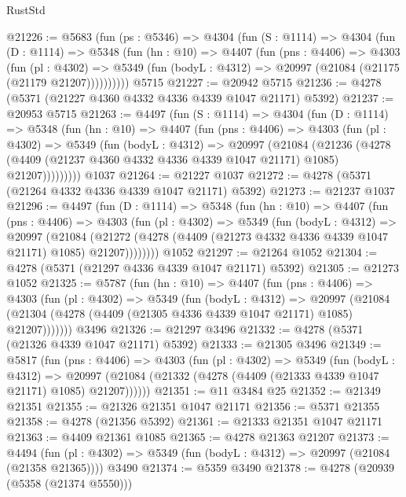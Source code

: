 \begin{lexlean}{RustStd}
\begin{coremodule}
{\begin{coremodule}
{{{{{{{{{{{{{{{{{{{{{{{{{{{{{{{{{{{@21226 := @5683
    (fun (ps : @5346) =>
    @4304
      (fun (S : @1114) =>
      @4304
        (fun (D : @1114) =>
        @5348
          (fun (hn : @10) =>
          @4407
            (fun (pns : @4406) =>
            @4303
              (fun (pl : @4302) =>
              @5349 (fun (bodyL : @4312) => @20997 (@21084 (@21175 (@21179 @21207))))))))))
    @5715
@21227 := @20942 @5715
@21236 := @4278 (@5371 (@21227 @4360 @4332 @4336 @4339 @1047 @21171) @5392)
@21237 := @20953 @5715
@21263 := @4497
    (fun (S : @1114) =>
    @4304
      (fun (D : @1114) =>
      @5348
        (fun (hn : @10) =>
        @4407
          (fun (pns : @4406) =>
          @4303
            (fun (pl : @4302) =>
            @5349
              (fun (bodyL : @4312) =>
              @20997
                (@21084
                  (@21236
                    (@4278
                      (@4409 (@21237 @4360 @4332 @4336 @4339 @1047 @21171) @1085)
                      @21207)))))))))
    @1037
@21264 := @21227 @1037
@21272 := @4278 (@5371 (@21264 @4332 @4336 @4339 @1047 @21171) @5392)
@21273 := @21237 @1037
@21296 := @4497
    (fun (D : @1114) =>
    @5348
      (fun (hn : @10) =>
      @4407
        (fun (pns : @4406) =>
        @4303
          (fun (pl : @4302) =>
          @5349
            (fun (bodyL : @4312) =>
            @20997
              (@21084
                (@21272 (@4278 (@4409 (@21273 @4332 @4336 @4339 @1047 @21171) @1085) @21207))))))))
    @1052
@21297 := @21264 @1052
@21304 := @4278 (@5371 (@21297 @4336 @4339 @1047 @21171) @5392)
@21305 := @21273 @1052
@21325 := @5787
    (fun (hn : @10) =>
    @4407
      (fun (pns : @4406) =>
      @4303
        (fun (pl : @4302) =>
        @5349
          (fun (bodyL : @4312) =>
          @20997
            (@21084 (@21304 (@4278 (@4409 (@21305 @4336 @4339 @1047 @21171) @1085) @21207)))))))
    @3496
@21326 := @21297 @3496
@21332 := @4278 (@5371 (@21326 @4339 @1047 @21171) @5392)
@21333 := @21305 @3496
@21349 := @5817
    (fun (pns : @4406) =>
    @4303
      (fun (pl : @4302) =>
      @5349
        (fun (bodyL : @4312) =>
        @20997 (@21084 (@21332 (@4278 (@4409 (@21333 @4339 @1047 @21171) @1085) @21207))))))
@21351 := @11 @3484 @25
@21352 := @21349 @21351
@21355 := @21326 @21351 @1047 @21171
@21356 := @5371 @21355
@21358 := @4278 (@21356 @5392)
@21361 := @21333 @21351 @1047 @21171
@21363 := @4409 @21361 @1085
@21365 := @4278 @21363 @21207
@21373 := @4494
    (fun (pl : @4302) => @5349 (fun (bodyL : @4312) => @20997 (@21084 (@21358 @21365))))
    @3490
@21374 := @5359 @3490
@21378 := @4278 (@20939 (@5358 (@21374 @5550)))
}}}}}}}}}}}}}}}}}}}}}}}}}}}}}}}}}}}
\end{coremodule}}
\end{coremodule}
\end{lexlean}
